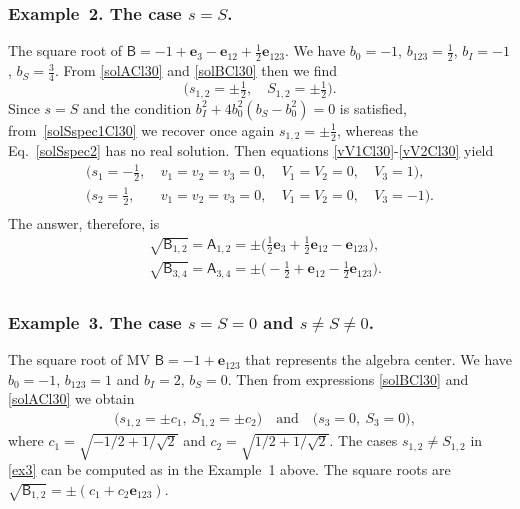 \documentclass{birkjour}
\newcommand{\e}[1]{\mathbf{e}_{#1}} %
\def\A{\mathsf{A}}
\def\B{\mathsf{B}}
\def\e#1{\mathbf{e}_{#1}} %
\begin{document}
\subsubsection*{Example~2. The case $s=S$.\label{exmp2}}
The square root of $\B=-1+\e{3}-\e{12}+\frac12\e{123}$. We have
$b_0=-1$, $b_{123}=\tfrac12$, $b_I=-1$, $b_S=\tfrac34$. From
\eqref{solACl30} and \eqref{solBCl30} then we find
\begin{equation}\label{ex2}
\bigl(s_{1,2}=\pm\tfrac{1}{2},\quad S_{1,2}=\pm\tfrac{1}{2}\bigr).
\end{equation}
Since $s=S$ and the condition $b_{I}^2+4 b_0^2(b_S- b_0^2)=0$ is
satisfied, from~\eqref{solSspec1Cl30} we recover once again
$s_{1,2}=\pm\frac12$, whereas the Eq.~\eqref{solSspec2} has no
real solution. Then equations \eqref{vV1Cl30}-\eqref{vV2Cl30}
yield
\begin{equation}\begin{array}{llll}\label{ex2a}
\bigl(s_1=-\tfrac{1}{2},&\ v_1=v_2=v_3=0,&\ V_1=V_2=0,&\ V_3=1\bigr),\\
\bigl(s_2=\tfrac{1}{2},&\ v_1=v_2=v_3=0,&\ V_1=V_2=0,&\ V_3=-1\bigr).\\
\end{array}\end{equation}
The answer, therefore, is
\begin{equation}\begin{split}\label{ex2fa}
  &\sqrt{\B_{1,2}} =\A_{1,2}= \pm \bigl( \tfrac12 \e{3} + \tfrac12 \e{12}-\e{1 2 3}\bigr),\\
  &\sqrt{\B_{3,4}}= \A_{3,4}= \pm \bigl(-\tfrac12 +\e{12}-\tfrac12 \e{1 2 3}\bigr).\\
\end{split}\end{equation}


\subsubsection*{Example~3. The case $s=S=0$ and $s\ne S\ne 0$.}\label{ex3Cl30}
The square root of MV $\B=-1+\e{123}$ that represents the
algebra center.
 We have $b_0=-1$, $b_{123}=1$ and $b_I=2$, $b_S=0$. Then
from expressions  \eqref{solBCl30} and \eqref{solACl30} we obtain
\begin{equation}\label{ex3}\begin{split}
&\bigl(s_{1,2}=\pm c_1,\ S_{1,2}=\pm c_2\bigr)\quad
\text{and}\quad  \bigl(s_{3}=0,\ S_{3}=0\bigr),
\end{split}\end{equation}
where  $c_1=\sqrt{-1/2+1/\sqrt{2}}$ and
$c_2=\sqrt{1/2+1/\sqrt{2}}$. The cases $s_{1,2}\neq S_{1,2}$ in
\eqref{ex3} can be computed as in the Example~1 above.
The square roots are $\sqrt{\B_{1,2}} = \pm (c_1+c_2 \e{123})$.
\end{document}
